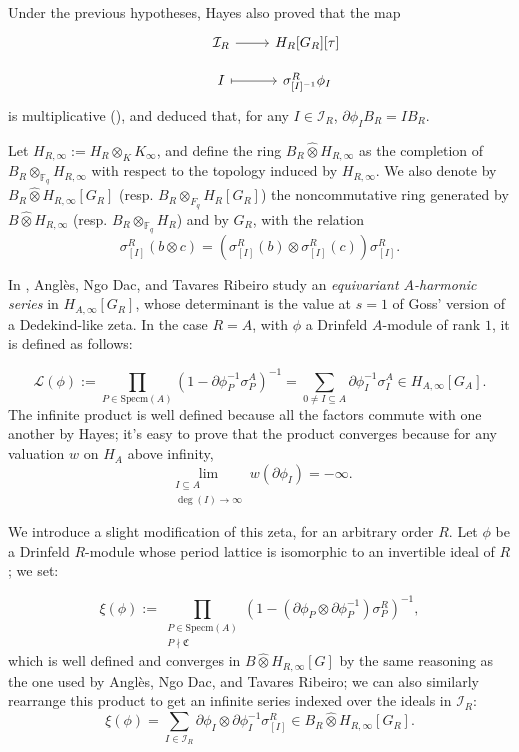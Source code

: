 \documentclass[11pt]{amsart}
\numberwithin{equation}{section}
\newcommand{\FF}{\mathbb{F}}
\begin{document}
Under the previous hypotheses, Hayes also proved that the map
\[\begin{tikzcd}[row sep=small]
    &\mathcal{I}_R\arrow[r]& H_R[G_R][\tau]\\
    &I\arrow[r,mapsto]&\sigma^R_{[I]^{-1}}\phi_I
\end{tikzcd}\]
is multiplicative (\cite[Thm. 3.10]{Hayes}), and deduced that, for any $I\in \mathcal{I}_R$, $\partial\phi_I B_R=I B_R$.

\vspace{5mm}
Let $H_{R,\infty}:= H_R\otimes_K K_\infty$, and define the ring $B_R\hat{\otimes}H_{R,\infty}$ as the completion of $B_R\otimes_{\FF_q}H_{R,\infty}$ with respect to the topology induced by $H_{R,\infty}$. We also denote by $B_R\hat{\otimes}H_{R,\infty}[G_R]$ (resp. $B_R\otimes_{F_q} H_R[G_R]$) the noncommutative ring generated by $B\hat{\otimes}H_{R,\infty}$ (resp. $B_R\otimes_{\FF_q}H_R$) and by $G_R$, with the relation \[{\sigma^R_{[I]}}(b\otimes c)=({\sigma^R_{[I]}}(b)\otimes{\sigma^R_{[I]}}(c)){\sigma^R_{[I]}}.\]

In \cite[\S 3.3]{ANG&NGO&TAV}, Anglès, Ngo Dac, and Tavares Ribeiro study an \emph{equivariant $A$-harmonic series} in $H_{A,\infty}[G_R]$, whose determinant is the value at $s=1$ of Goss' version of a Dedekind-like zeta. In the case $R=A$, with $\phi$ a Drinfeld $A$-module of rank $1$, it is defined as follows:

\[\mathcal{L}(\phi):=\prod_{P\in\mathrm{Specm}(A)}(1-\partial\phi_P^{-1}{\sigma^A_P})^{-1}=\sum_{0\neq I\subseteq A}\partial\phi_I^{-1}{\sigma^A_I}\in H_{A,\infty}[G_A].\]
The infinite product is well defined because all the factors commute with one another by Hayes; it's easy to prove that the product converges because for any valuation $w$ on $H_A$ above infinity, \[\lim_{\substack{I\subseteq A\\\deg(I)\to\infty}}w(\partial\phi_I)=-\infty.\]

We introduce a slight modification of this zeta, for an arbitrary order $R$. Let $\phi$ be a Drinfeld $R$-module whose period lattice is isomorphic to an invertible ideal of $R$; we set:

\[\xi(\phi):=\prod_{\substack{P\in\mathrm{Specm}(A)\\P\nmid\mathfrak{C}}}(1-(\partial\phi_P\otimes\partial\phi_P^{-1}){\sigma^R_P})^{-1},\]
which is well defined and converges in $B\hat\otimes H_{R,\infty}[G]$ by the same reasoning as the one used by Anglès, Ngo Dac, and Tavares Ribeiro; we can also similarly rearrange this product to get an infinite series indexed over the ideals in $\mathcal{I}_R$:
\[\xi(\phi)=\sum_{I\in\mathcal{I}_R}\partial\phi_I\otimes\partial\phi_I^{-1}\sigma^R_{[I]}\in B_R\hat\otimes H_{R,\infty}[G_R].\]
\end{document}
